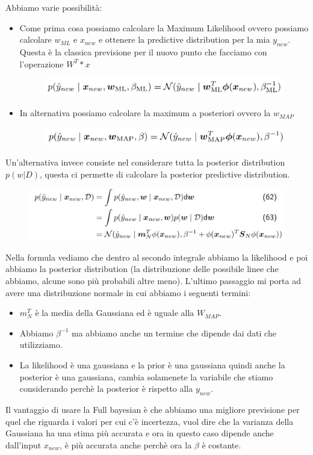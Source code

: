 \documentclass[14pt]{extreport}
\begin{document}
Abbiamo varie possibilità:
\begin{itemize}
\item Come prima cosa possiamo calcolare la Maximum Likelihood ovvero possiamo calcolare $w_{ML}$ e $x_{new}$ e ottenere la predictive distribution
per la mia $y_{new}$. Questa è la classica previsione per il nuovo punto che facciamo con l'operazione $W^T*x$ \begin{figure}[H]
\centering
\includegraphics[width=0.7\linewidth]{136.jpeg}
\end{figure}
\item In alternativa possiamo calcolare la maximum a posteriori ovvero la $w_{MAP}$ \begin{figure}[H]
\centering
\includegraphics[width=0.7\linewidth]{137.jpeg}
\end{figure}
\end{itemize}

Un'alternativa invece consiste nel considerare tutta la posterior distribution $p(w|D)$, questa ci permette di calcolare la posterior predictive
distribution.
 
 \begin{figure}[H]
\centering
\includegraphics[width=0.7\linewidth]{138.jpeg}
\end{figure}
Nella formula vediamo che dentro al secondo integrale abbiamo la likelihood e poi abbiamo la posterior distribution (la distribuzione delle possibile
linee che abbiamo, alcune sono più probabili altre meno). L'ultimo passaggio mi porta ad avere una distribuzione normale in cui abbiamo i seguenti
termini:
\begin{itemize}
\item $m^T_N$ è la media della Gaussiana ed è uguale alla $W_{MAP}$.
\item Abbiamo $\beta^{-1}$ ma abbiamo anche un termine che dipende dai dati che utilizziamo.
\item La likelihood è una gaussiana e la prior è una gaussiana quindi anche la posterior è una gaussiana, cambia solamenete la variabile che stiamo
considerando perchè la posterior è rispetto alla $y_{new}$.
\end{itemize}
Il vantaggio di usare la Full bayesian è che abbiamo una migliore previsione per quel che riguarda i valori per cui c'è incertezza, vuol dire che la
varianza della Gaussiana ha una stima più accurata e ora in questo caso dipende anche dall'input $x_{new}$, è più accurata anche perchè ora la $\beta$
è costante.
\end{document}
